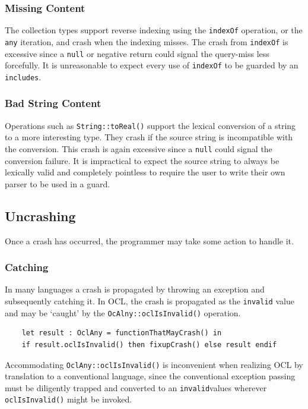 \documentclass[
]{ceurart}
\begin{document}
\subsubsection{Missing Content}

The collection types support reverse indexing using the \verb|indexOf| operation, or the \verb|any| iteration, and crash when the indexing misses. The crash from \verb|indexOf| is excessive since a \verb|null| or negative return could signal the query-miss less forcefully. It is unreasonable to expect every use of \verb|indexOf| to be guarded by an \verb|includes|.

\subsubsection{Bad String Content}

Operations such as \verb|String::toReal()| support the lexical conversion of a string to a more interesting type. They crash if the source string is incompatible with the conversion. This crash is again excessive since a \verb|null| could signal the conversion failure. It is impractical to expect the source string to always be lexically valid and completely pointless to require the user to write their own parser to be used in a guard.

\subsection{Uncrashing}

Once a crash has occurred, the programmer may take some action to handle it.

\subsubsection{Catching}

In many languages a crash is propagated by throwing an exception and subsequently catching it. In OCL, the crash is propagated as the \verb|invalid| value and may be `caught' by the \verb|OcAlny::oclIsInvalid()| operation.

\begin{verbatim}
    let result : OclAny = functionThatMayCrash() in
    if result.oclIsInvalid() then fixupCrash() else result endif
\end{verbatim}

Accommodating \verb|OclAny::oclIsInvalid()| is inconvenient when realizing OCL by translation to a conventional language, since the conventional exception passing must be diligently trapped and converted to an \verb|invalid|values wherever \verb|oclIsInvalid()| might be invoked.
\end{document}
